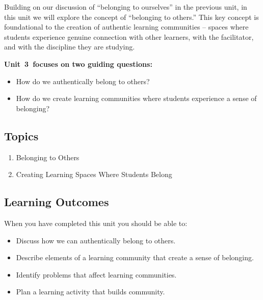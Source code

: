 \documentclass[
]{book}
\providecommand{\tightlist}{%
  \setlength{\itemsep}{0pt}\setlength{\parskip}{0pt}}
\begin{document}
Building on our discussion of ``belonging to ourselves'' in the previous
unit, in this unit we will explore the concept of ``belonging to others.''
This key concept is foundational to the creation of authentic learning
communities -- spaces where students experience genuine connection with
other learners, with the facilitator, and with the discipline they are
studying.

\textbf{Unit~3~focuses on two guiding questions:}

\begin{itemize}
\tightlist
\item
  How do we authentically belong to others?\\
\item
  How do we create learning communities where students experience a sense of belonging?
\end{itemize}

\hypertarget{topics-2}{%
\subsection*{Topics}\label{topics-2}}

\begin{enumerate}
\def\labelenumi{\arabic{enumi}.}
\tightlist
\item
  Belonging to Others
\item
  Creating Learning Spaces Where Students Belong
\end{enumerate}

\hypertarget{learning-outcomes-2}{%
\subsection*{Learning Outcomes}\label{learning-outcomes-2}}

When you have completed this unit you should be able to:

\begin{itemize}
\tightlist
\item
  Discuss how we can authentically belong to others.\\
\item
  Describe elements of a learning community that create a sense of belonging.\\
\item
  Identify problems that affect learning communities.\\
\item
  Plan a learning activity that builds community.
\end{itemize}
\end{document}
